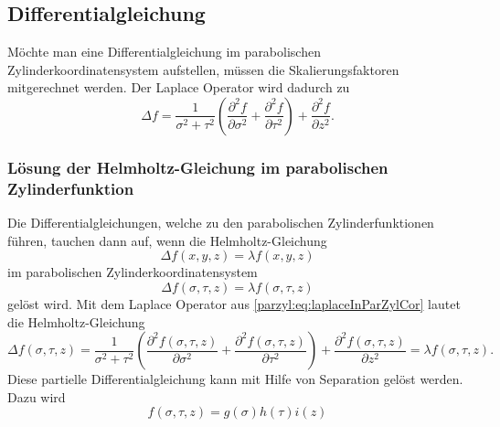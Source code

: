 \subsection{Differentialgleichung}
Möchte man eine Differentialgleichung im parabolischen 
Zylinderkoordinatensystem aufstellen, müssen die Skalierungsfaktoren
mitgerechnet werden.
Der Laplace Operator wird dadurch zu
\begin{equation}
    \Delta f = \frac{1}{\sigma^2 + \tau^2} 
        \left( 
            \frac{\partial^2 f}{\partial \sigma ^2} +
            \frac{\partial^2 f}{\partial \tau ^2}
        \right)
        + \frac{\partial^2 f}{\partial z^2}.
    \label{parzyl:eq:laplaceInParZylCor}
\end{equation}
\subsubsection{Lösung der Helmholtz-Gleichung im parabolischen Zylinderfunktion}
Die Differentialgleichungen, welche zu den parabolischen Zylinderfunktionen führen, tauchen
dann auf, wenn die Helmholtz-Gleichung
\begin{equation}
	\Delta f(x,y,z) = \lambda f(x,y,z) 
\end{equation}
im parabolischen Zylinderkoordinatensystem
\begin{equation}
	\Delta f(\sigma,\tau,z) = \lambda f(\sigma,\tau,z) 
\end{equation}
gelöst wird.
Mit dem Laplace Operator aus \eqref{parzyl:eq:laplaceInParZylCor} lautet die Helmholtz-Gleichung
\begin{equation}
	\Delta f(\sigma, \tau, z)
	=
	\frac{1}{\sigma^2 + \tau^2}
	\left ( 
	\frac{\partial^2 f(\sigma,\tau,z)}{\partial \sigma^2} 
	+ 
	\frac{\partial^2 f(\sigma,\tau,z)}{\partial \tau^2}
	\right )
	+ 
	\frac{\partial^2 f(\sigma,\tau,z)}{\partial z^2}
	= 
	\lambda f(\sigma,\tau,z).
\end{equation}
Diese partielle Differentialgleichung kann mit Hilfe von Separation gelöst werden. Dazu wird 
\begin{equation}
	f(\sigma,\tau,z) = g(\sigma)h(\tau)i(z)
\end{equation}
